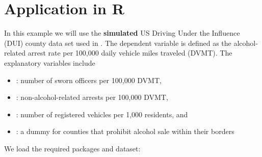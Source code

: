\documentclass[english,12pt]{book}\usepackage[]{graphicx}\usepackage[]{xcolor}
\begin{document}

%




\section{Application in R}

In this example we will use the \textbf{simulated} US Driving Under the Influence (DUI) county data set used in \cite{drukker2011command}. The dependent variable  is defined as the alcohol-related arrest rate per 100,000 daily vehicle miles traveled (DVMT). The explanatory variables include 

\begin{itemize}
  \item {}: number of sworn officers per 100,000 DVMT,
  \item {}: non-alcohol-related arrests per 100,000 DVMT,
  \item {}: number of registered vehicles per 1,000 residents, and
  \item {}: a dummy for counties that prohibit alcohol sale within their borders
\end{itemize}

We load the required packages and dataset:
\end{document}

